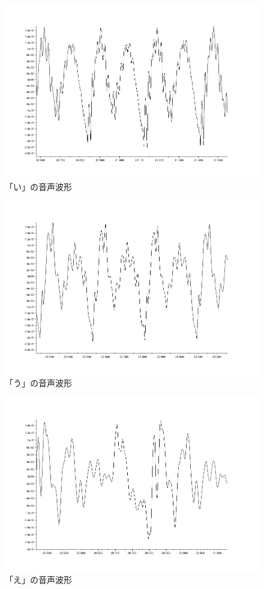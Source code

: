 \documentclass[12pt,oneside]{sotsuken_paper}
\begin{document}
\begin{figure}[htbp]
\begin{center}
\includegraphics[width=120mm]{img/i.png}
\caption{「い」の音声波形}
\label{fig:voice-i}
\end{center}
\end{figure}


\begin{figure}[htbp]
\begin{center}
\includegraphics[width=120mm]{img/u.png}
\caption{「う」の音声波形}
\label{fig:voice-u}
\end{center}
\end{figure}


\begin{figure}[htbp]
\begin{center}
\includegraphics[width=120mm]{img/e.png}
\caption{「え」の音声波形}
\label{fig:voice-e}
\end{center}
\end{figure}
\end{document}
